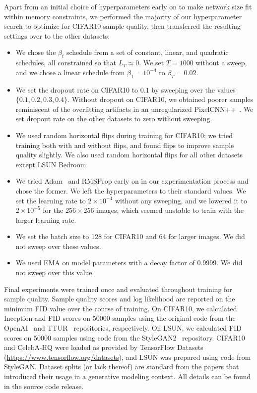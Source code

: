 \documentclass{article}
\begin{document}
Apart from an initial choice of hyperparameters early on to make network size fit within memory constraints, we performed the majority of our hyperparameter search to optimize for CIFAR10 sample quality, then transferred the resulting settings over to the other datasets:
\begin{itemize}
    \item We chose the $\beta_t$ schedule from a set of constant, linear, and quadratic schedules, all constrained so that $L_T \approx 0$. We set $T=1000$ without a sweep, and we chose a linear schedule from $\beta_1=10^{-4}$ to $\beta_T=0.02$. 
    \item We set the dropout rate on CIFAR10 to $0.1$ by sweeping over the values $\{0.1, 0.2, 0.3, 0.4\}$. Without dropout on CIFAR10, we obtained poorer samples reminiscent of the overfitting artifacts in an unregularized PixelCNN++~\citep{salimans2017pixelcnn++}. We set dropout rate on the other datasets to zero without sweeping.
    \item We used random horizontal flips during training for CIFAR10; we tried training both with and without flips, and found flips to improve sample quality slightly. We also used random horizontal flips for all other datasets except LSUN Bedroom.
    \item We tried Adam~\citep{kingma2014adam} and RMSProp early on in our experimentation process and chose the former. We left the hyperparameters to their standard values. We set the learning rate to $2 \times 10^{-4}$ without any sweeping, and we lowered it to $2 \times 10^{-5}$ for the $256\times256$ images, which seemed unstable to train with the larger learning rate.
    \item We set the batch size to 128 for CIFAR10 and 64 for larger images. We did not sweep over these values.
    \item We used EMA on model parameters with a decay factor of 0.9999. We did not sweep over this value.
\end{itemize}

Final experiments were trained once and evaluated throughout training for sample quality. Sample quality scores and log likelihood are reported on the minimum FID value over the course of training. On CIFAR10, we calculated Inception and FID scores on 50000 samples using the original code from the OpenAI~\citep{salimans2016improved} and TTUR~\citep{heusel2017gans} repositories, respectively. On LSUN, we calculated FID scores on 50000 samples using code from the StyleGAN2~\citep{karras2019analyzing} repository. CIFAR10 and CelebA-HQ were loaded as provided by TensorFlow Datasets (\url{https://www.tensorflow.org/datasets}), and LSUN was prepared using code from StyleGAN. Dataset splits (or lack thereof) are standard from the papers that introduced their usage in a generative modeling context. All details can be found in the source code release.
\end{document}
